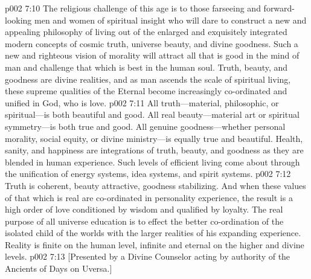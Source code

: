 \vs p002 7:10 The religious challenge of this age is to those farseeing and forward\hyp{}looking men and women of spiritual insight who will dare to construct a new and appealing philosophy of living out of the enlarged and exquisitely integrated modern concepts of cosmic truth, universe beauty, and divine goodness. Such a new and righteous vision of morality will attract all that is good in the mind of man and challenge that which is best in the human soul. Truth, beauty, and goodness are divine realities, and as man ascends the scale of spiritual living, these supreme qualities of the Eternal become increasingly co\hyp{}ordinated and unified in God, who is love.\plusone
\pc \vs p002 7:11 All truth---material, philosophic, or spir\-i\-tu\-al---is both beautiful and good. All real beauty---material art or spiritual symmetry---is both true and good. All genuine good\-ness---whether personal morality, social equity, or divine ministry---is equally true and beautiful. Health, sanity, and happiness are integrations of truth, beauty, and goodness as they are blended in human experience. Such levels of efficient living come about through the unification of energy systems, idea systems, and spirit systems.
\vs p002 7:12 Truth is coherent, beauty attractive, goodness stabilizing. And when these values of that which is real are co\hyp{}ordinated in personality experience, the result is a high order of love conditioned by wisdom and qualified by loyalty. The real purpose of all universe education is to effect the better co\hyp{}ordination of the isolated child of the worlds with the larger realities of his expanding experience. Reality is finite on the human level, infinite and eternal on the higher and divine levels.
\vsetoff
\vs p002 7:13 [Presented by a Divine Counselor acting by authority of the Ancients of Days on Uversa.]
